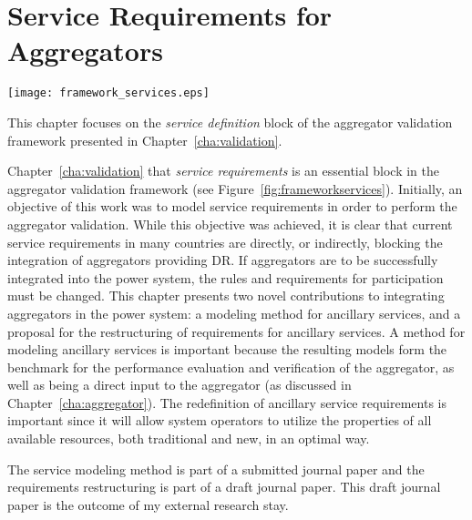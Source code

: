 \chapter{Service Requirements for Aggregators} %
\label{cha:services}
\begin{marginfigure}
	\texttt{[image: framework\_services.eps]}
	\caption{This chapter focuses on the \emph{service definition} block of the aggregator validation framework presented in Chapter~\ref{cha:validation}.}
      \label{fig:frameworkservices}
\end{marginfigure}
 Chapter~\ref{cha:validation} that \emph{service requirements} is an essential block in the aggregator validation framework (see Figure~\ref{fig:frameworkservices}). Initially, an objective of this work was to model service requirements in order to perform the aggregator validation. While this objective was achieved, it is clear that current service requirements in many countries are directly, or indirectly, blocking the integration of aggregators providing DR. If aggregators are to be successfully integrated into the power system, the rules and requirements for participation must be changed. This chapter presents two novel contributions to integrating aggregators in the power system: a modeling method for ancillary services, and a proposal for the restructuring of requirements for ancillary services. A method for modeling ancillary services is important because the resulting models form the benchmark for the performance evaluation and verification of the aggregator, as well as being a direct input to the aggregator (as discussed in Chapter~\ref{cha:aggregator}). The redefinition of ancillary service requirements is important since it will allow system operators to utilize the properties of all available resources, both traditional and new, in an optimal way.

The service modeling method is part of a submitted journal paper and the requirements restructuring is part of a draft journal paper. This draft journal paper is the outcome of my external research stay.


